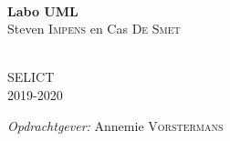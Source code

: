 \begin{titlepage}
\begin{center}

\HRule \\[0.4cm]
{ \LARGE \bfseries Labo UML}\\[0.4cm]
{Steven \textsc{Impens} en Cas \textsc{De Smet}}\\[0.2cm]

\HRule \\[1.5cm]

\vfill

\begin{minipage}{0.49\textwidth}
\begin{flushleft} \large
SELICT\\
2019-2020\\
\end{flushleft}
\end{minipage}
\begin{minipage}{0.49\textwidth}
\begin{flushright} \large
\emph{Opdrachtgever:}
Annemie \textsc{Vorstermans}\\
\end{flushright}
\end{minipage}

\end{center}
\end{titlepage}
